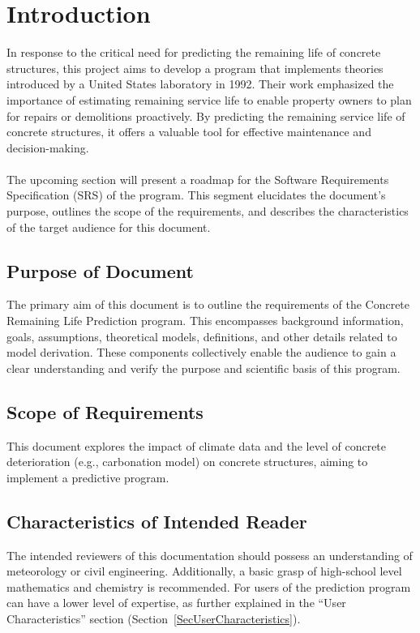 \documentclass[12pt]{article}
\begin{document}

\section{Introduction}
In response to the critical need for predicting the remaining life of concrete structures, this project aims to develop a program that implements theories introduced by a United States laboratory in 1992. Their work emphasized the importance of estimating remaining service life to enable property owners to plan for repairs or demolitions proactively. By predicting the remaining service life of concrete structures, it offers a valuable tool for effective maintenance and decision-making. \\
\\
The upcoming section will present a roadmap for the Software Requirements Specification (SRS) of the program. This segment elucidates the document's purpose, outlines the scope of the requirements, and describes the characteristics of the target audience for this document.

\subsection{Purpose of Document}

The primary aim of this document is to outline the requirements of the Concrete Remaining Life Prediction program. This encompasses background information, goals, assumptions, theoretical models, definitions, and other details related to model derivation. These components collectively enable the audience to gain a clear understanding and verify the purpose and scientific basis of this program.

\subsection{Scope of Requirements} 
This document explores the impact of climate data and the level of concrete deterioration (e.g., carbonation model) on concrete structures, aiming to implement a predictive program.

\subsection{Characteristics of Intended Reader} \label{sec_IntendedReader}
The intended reviewers of this documentation should possess an understanding of meteorology or civil engineering. Additionally, a basic grasp of high-school level mathematics and chemistry is recommended. For users of the prediction program can have a lower level of expertise, as further explained in the ``User Characteristics'' section (Section~\ref{SecUserCharacteristics}).
\end{document}

